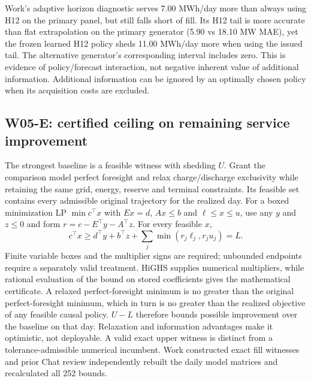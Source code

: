 \documentclass[11pt,letterpaper]{article}
\begin{document}
Work's adaptive horizon diagnostic serves 7.00 MWh/day more than always using H12 on the primary panel, but still falls short of fill. Its H12 tail is more accurate than flat extrapolation on the primary generator (5.90 vs 18.10 MW MAE), yet the frozen learned H12 policy sheds 11.00 MWh/day more when using the issued tail. The alternative generator's corresponding interval includes zero. This is evidence of policy/forecast interaction, not negative inherent value of additional information. Additional information can be ignored by an optimally chosen policy when its acquisition costs are excluded.

\subsection{W05-E: certified ceiling on remaining service improvement}
\label{sec:w05service}
The strongest baseline is a feasible witness with shedding $U$. Grant the comparison model perfect foresight and relax charge/discharge exclusivity while retaining the same grid, energy, reserve and terminal constraints. Its feasible set contains every admissible original trajectory for the realized day. For a boxed minimization LP $\min c^\top x$ with $Ex=d$, $Ax\le b$ and $\ell\le x\le u$, use any $y$ and $z\le0$ and form $r=c-E^\top y-A^\top z$. For every feasible $x$,
\begin{equation}
 c^\top x\ge d^\top y+b^\top z+\sum_j\min(r_j\ell_j,r_ju_j)=L.
 \label{eq:coabox}
\end{equation}
Finite variable boxes and the multiplier signs are required; unbounded endpoints require a separately valid treatment. HiGHS supplies numerical multipliers, while rational evaluation of the bound on stored coefficients gives the mathematical certificate. A relaxed perfect-foresight minimum is no greater than the original perfect-foresight minimum, which in turn is no greater than the realized objective of any feasible causal policy. $U-L$ therefore bounds possible improvement over the baseline on that day. Relaxation and information advantages make it optimistic, not deployable. A valid exact upper witness is distinct from a tolerance-admissible numerical incumbent. Work constructed exact fill witnesses and prior Chat review independently rebuilt the daily model matrices and recalculated all 252 bounds.
\end{document}
